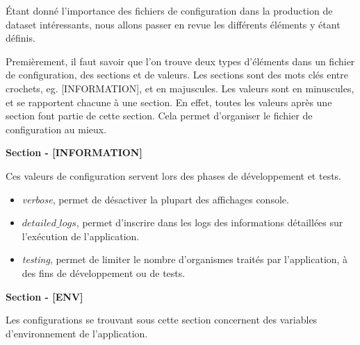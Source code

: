 Étant donné l'importance des fichiers de configuration dans la production de dataset intéressants, nous allons passer en revue les différents éléments y étant définis.

Premièrement, il faut savoir que l'on trouve deux types d'éléments dans un fichier de configuration, des sections et de valeurs. Les sections sont des mots clés entre crochets, eg. [INFORMATION], et en majuscules. Les valeurs sont en minuscules, et se rapportent chacune à une section. En effet, toutes les valeurs après une section font partie de cette section. Cela permet d'organiser le fichier de configuration au mieux.

\textbf{Section - [INFORMATION]}

Ces valeurs de configuration servent lors des phases de développement et tests.

\begin{itemize}
\item \emph{verbose}, permet de désactiver la plupart des affichages console.
\item \emph{$detailed\_logs$}, permet d'inscrire dans les logs des informations détaillées sur l'exécution de l'application.
\item \emph{testing}, permet de limiter le nombre d'organismes traités par l'application, à des fins de développement ou de tests. 
\end{itemize}

\textbf{Section - [ENV]}

Les configurations se trouvant sous cette section concernent des variables d'environnement de l'application.

